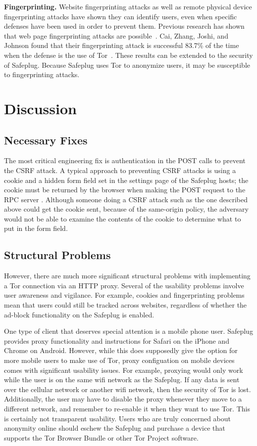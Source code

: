 \documentclass[letterpaper,twocolumn,10pt]{article}
\begin{document}
{\bf Fingerprinting.}  Website fingerprinting attacks as well as remote physical device fingerprinting attacks have shown they can identify users, even when specific defenses have been used in order to prevent them. Previous research has shown that web page fingerprinting attacks are possible~\cite{dyer, herrmann, panchenko}.  Cai, Zhang, Joshi, and Johnson found that their fingerprinting attack is successful 83.7\% of the time when the defense is the use of Tor~\cite{fingerprint1}.  These results can be extended to the security of Safeplug.  Because Safeplug uses Tor to anonymize users, it may be susceptible to fingerprinting attacks.

\section{Discussion}
\subsection{Necessary Fixes}
The most critical engineering fix is authentication in the POST calls to prevent the CSRF attack.  A typical approach to preventing CSRF attacks is using a cookie and a hidden form field set in the settings page of the Safeplug hosts; the cookie must be returned by the browser when making the POST request to the RPC server \cite{csrfdef}.  Although someone doing a CSRF attack such as the one described above could get the cookie sent, because of the same-origin policy, the adversary would not be able to examine the contents of the cookie to determine what to put in the form field.

\subsection{Structural Problems}
However, there are much more significant structural problems with implementing a Tor connection via an HTTP proxy.  Several of the usability problems involve user awareness and vigilance.  For example, cookies and fingerprinting problems mean that users could still be tracked across websites, regardless of whether the ad-block functionality on the Safeplug is enabled.  

One type of client that deserves special attention is a mobile phone user.  Safeplug provides proxy functionality and instructions for Safari on the iPhone and Chrome on Android.  However, while this does supposedly give the option for more mobile users to make use of Tor, proxy configuation on mobile devices comes with significant usability issues.  For example, proxying would only work while the user is on the same wifi network as the Safeplug.  If any data is sent over the cellular network or another wifi network, then the security of Tor is lost.  Additionally, the user may have to disable the proxy whenever they move to a different network, and remember to re-enable it when they want to use Tor.  This is certainly not transparent usability.  Users who are truly concerned about anonymity online should eschew the Safeplug and purchase a device that supports the Tor Browser Bundle or other Tor Project software.
\end{document}
